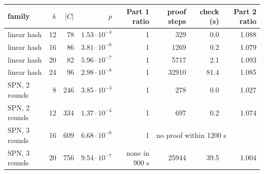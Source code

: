 \begin{tabular}{lrrrrrrr}
\toprule
family & $k$ & $|C|$ & $p$ & Part 1 ratio & proof steps & check (s) & Part 2 ratio\\
\midrule
linear hash & 12 & 78 & $1.53\cdot10^{-4}$ & 1 & 329 & 0.0 & 1.088\\
linear hash & 16 & 86 & $3.81\cdot10^{-6}$ & 1 & 1269 & 0.2 & 1.079\\
linear hash & 20 & 82 & $5.96\cdot10^{-7}$ & 1 & 5717 & 2.1 & 1.093\\
linear hash & 24 & 96 & $2.98\cdot10^{-8}$ & 1 & 32910 & 81.4 & 1.085\\
SPN, 2 rounds & 8 & 246 & $3.85\cdot10^{-3}$ & 1 & 278 & 0.0 & 1.027\\
SPN, 2 rounds & 12 & 334 & $1.37\cdot10^{-4}$ & 1 & 697 & 0.2 & 1.074\\
SPN, 3 rounds & 16 & 609 & $6.68\cdot10^{-6}$ & 1 & \multicolumn{3}{l}{no proof within 1200 s}\\
SPN, 3 rounds & 20 & 756 & $9.54\cdot10^{-7}$ & none in 900 s & 25944 & 39.5 & 1.004\\
\bottomrule
\end{tabular}
